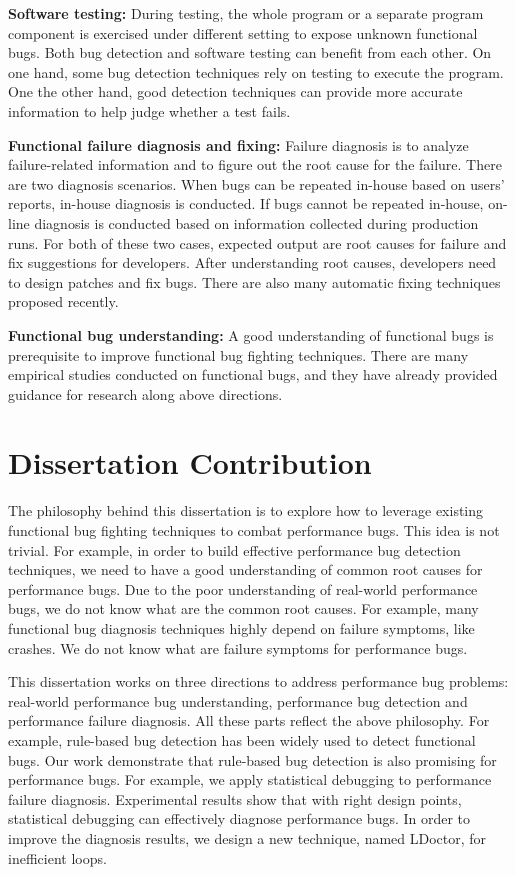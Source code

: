 {\bf Software testing:}
During testing, the whole program or a separate program component
is exercised under different setting to expose unknown functional bugs.
Both bug detection and software testing can benefit from each other.
On one hand, some bug detection techniques rely on testing to execute the program.
One the other hand, good detection techniques can provide more accurate information
to help judge whether a test fails.

{\bf Functional failure diagnosis and fixing:}
Failure diagnosis is to analyze failure-related information
and to figure out the root cause for the failure.
There are two diagnosis scenarios.
When bugs can be repeated in-house based on users' reports, in-house diagnosis is conducted.
If bugs cannot be repeated in-house,
on-line diagnosis is conducted based on information collected during production runs.
For both of these two cases,
expected output are root causes for failure and fix suggestions for developers.
After understanding root causes,
developers need to design patches and fix bugs.
There are also many automatic fixing techniques proposed recently.

{\bf Functional bug understanding:}
A good understanding of functional bugs is prerequisite
to improve functional bug fighting techniques.
There are many empirical studies conducted on functional bugs,
and they have already provided guidance for research along above directions.

\section{Dissertation Contribution}
The philosophy behind this dissertation is to
explore how to leverage existing functional bug fighting techniques
to combat performance bugs. This idea is not trivial.
For example, in order to build effective performance bug detection techniques,
we need to have a good understanding of common root causes for performance bugs.
Due to the poor understanding of real-world performance bugs,
we do not know what are the common root causes.
For example, many functional bug diagnosis techniques highly depend on failure symptoms, like crashes.
We do not know what are failure symptoms for performance bugs.

This dissertation works on three directions to address performance bug problems:
real-world performance bug understanding,
performance bug detection and performance failure diagnosis.
All these parts reflect the above philosophy.
For example, rule-based bug detection has been widely used to detect functional bugs.
Our work demonstrate that rule-based bug detection is also promising for performance bugs.
For example, we apply statistical debugging to performance failure diagnosis.
Experimental results show that with right design points,
statistical debugging can effectively diagnose performance bugs.
In order to improve the diagnosis results, we design a new technique, named LDoctor,
for inefficient loops.
